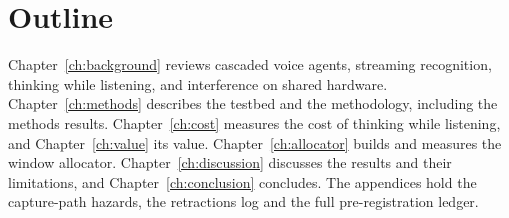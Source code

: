 \section{Outline}

Chapter~\ref{ch:background} reviews cascaded voice agents, streaming
recognition, thinking while listening, and interference on shared hardware.
Chapter~\ref{ch:methods} describes the testbed and the methodology, including
the methods results. Chapter~\ref{ch:cost} measures the cost of thinking while
listening, and Chapter~\ref{ch:value} its value. Chapter~\ref{ch:allocator}
builds and measures the window allocator. Chapter~\ref{ch:discussion}
discusses the results and their limitations, and Chapter~\ref{ch:conclusion}
concludes. The appendices hold the capture-path hazards, the retractions log
and the full pre-registration ledger.
